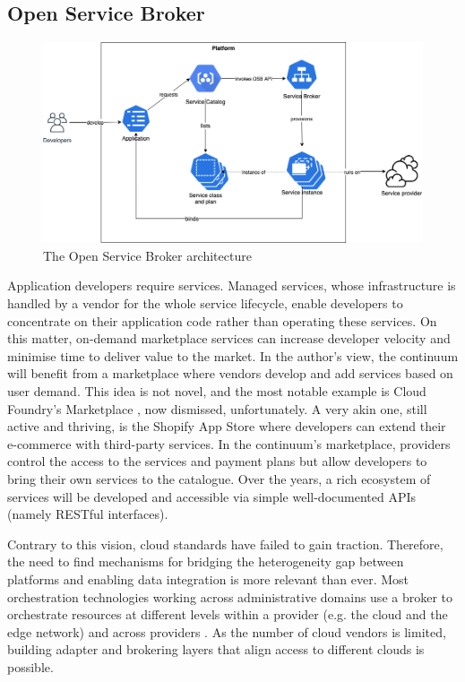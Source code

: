 \subsection{Open Service Broker}
\label{sec:osb}

\begin{figure}[ht]
\centering
\includegraphics[width=\columnwidth]{figures/osb}
\caption{The Open Service Broker architecture \label{fig:osb}}
\end{figure}

Application developers require services. Managed services, whose infrastructure is handled by a vendor for the whole service lifecycle, enable developers to concentrate on their application code rather than operating these services. On this matter, on-demand marketplace services can increase developer velocity and minimise time to deliver value to the market. In the author's view, the continuum will benefit from a marketplace where vendors develop and add services based on user demand. This idea is not novel, and the most notable example is Cloud Foundry's Marketplace \cite{cloud-foundry-marketplace}, now dismissed, unfortunately. A very akin one, still active and thriving, is the Shopify App Store \cite{shopify} where developers can extend their e-commerce with third-party services. In the continuum's marketplace, providers control the access to the services and payment plans but allow developers to bring their own services to the catalogue. Over the years, a rich ecosystem of services will be developed and accessible via simple well-documented APIs (namely RESTful interfaces).

Contrary to this vision, cloud standards have failed to gain traction. Therefore, the need to find mechanisms for bridging the heterogeneity gap between platforms and enabling data integration is more relevant than ever. Most orchestration technologies working across administrative domains use a broker to orchestrate resources at different levels within a provider (e.g. the cloud and the edge network) and across providers \cite{grozev2014inter}. As the number of cloud vendors is limited, building adapter and brokering layers that align access to different clouds is possible. 

